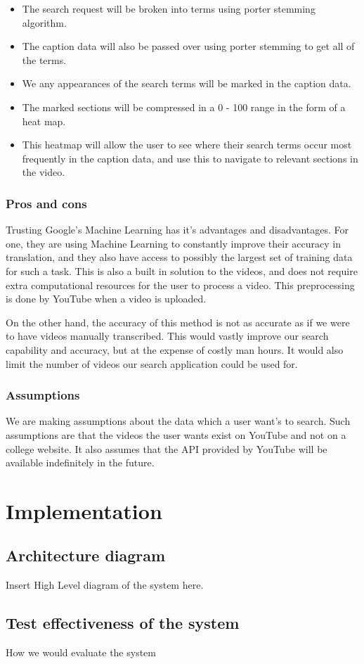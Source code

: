\documentclass[a4paper,12pt]{article}
\begin{document}
\begin{itemize}
    \item
        The search request will be broken into terms using porter stemming algorithm.
    \item
        The caption data will also be passed over using porter stemming to get all of the terms.
    \item
        We any appearances of the search terms will be marked in the caption data.
    \item
        The marked sections will be compressed in a 0 - 100 range in the form of a heat map.
    \item
        This heatmap will allow the user to see where their search terms occur most frequently in the caption data, and use this to navigate to relevant sections in the video.
\end{itemize}
\subsubsection{Pros and cons}
Trusting Google's Machine Learning has it's advantages and disadvantages. For one, they are using Machine Learning to constantly improve their accuracy in translation, and they also have access to possibly the largest set of training data for such a task. This is also a built in solution to the videos, and does not require extra computational resources for the user to process a video. This preprocessing is done by YouTube when a video is uploaded.

On the other hand, the accuracy of this method is not as accurate as if we were to have videos manually transcribed. This would vastly improve our search capability and accuracy, but at the expense of costly man hours. It would also limit the number of videos our search application could be used for.

\subsubsection{Assumptions}
We are making assumptions about the data which a user want's to search. Such assumptions are that the videos the user wants exist on YouTube and not on a college website. It also assumes that the API provided by YouTube will be available indefinitely in the future.

\section{Implementation}

\subsection{Architecture diagram}
Insert High Level diagram of the system here.

\subsection{Test effectiveness of the system}
How we would evaluate the system

\newpage
\theendnotes
\end{document}
